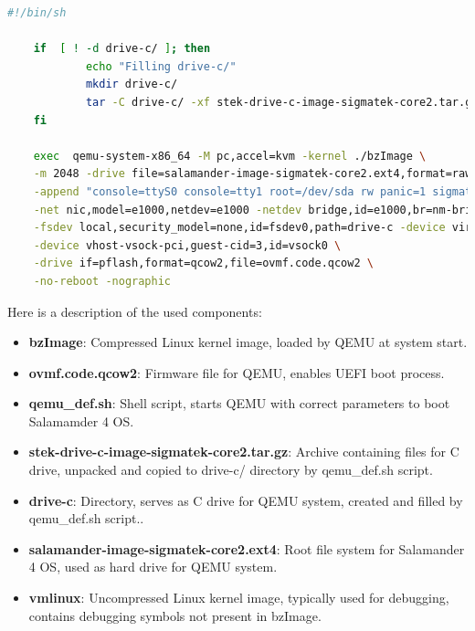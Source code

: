 \documentclass[MMR,Master,english]{twbook}
\begin{document}
\vspace{1em}
\begin{minipage}{\linewidth}
\begin{lstlisting}[language=bash,name={QEMU script for starting Salamander 4 virtualisation},label={lst:qemu_def}]
    #!/bin/sh

    if  [ ! -d drive-c/ ]; then
            echo "Filling drive-c/"
            mkdir drive-c/
            tar -C drive-c/ -xf stek-drive-c-image-sigmatek-core2.tar.gz
    fi
    
    exec  qemu-system-x86_64 -M pc,accel=kvm -kernel ./bzImage \
    -m 2048 -drive file=salamander-image-sigmatek-core2.ext4,format=raw,media=disk \
    -append "console=ttyS0 console=tty1 root=/dev/sda rw panic=1 sigmatek_lrt.QEMU=1 ip=dhcp rootfstype=ext4 schedstats=enable" \
    -net nic,model=e1000,netdev=e1000 -netdev bridge,id=e1000,br=nm-bridge \
    -fsdev local,security_model=none,id=fsdev0,path=drive-c -device virtio-9p-pci,id=fs0,fsdev=fsdev0,mount_tag=/mnt/drive-C \
    -device vhost-vsock-pci,guest-cid=3,id=vsock0 \
    -drive if=pflash,format=qcow2,file=ovmf.code.qcow2 \
    -no-reboot -nographic
\end{lstlisting}
\end{minipage}

Here is a description of the used components:
\begin{itemize}
    \item \textbf{bzImage}: Compressed Linux kernel image, loaded by QEMU at system start.
    \item \textbf{ovmf.code.qcow2}: Firmware file for QEMU, enables UEFI boot process.
    \item \textbf{qemu\_def.sh}: Shell script, starts QEMU with correct parameters to boot Salamamder 4 OS.
    \item \textbf{stek-drive-c-image-sigmatek-core2.tar.gz}: Archive containing files for C drive, unpacked and copied to drive-c/ directory by qemu\_def.sh script.
    \item \textbf{drive-c}: Directory, serves as C drive for QEMU system, created and filled by qemu\_def.sh script..
    \item \textbf{salamander-image-sigmatek-core2.ext4}: Root file system for Salamander 4 OS, used as hard drive for QEMU system.
    \item \textbf{vmlinux}: Uncompressed Linux kernel image, typically used for debugging, contains debugging symbols not present in bzImage.
\end{itemize}
\end{document}
